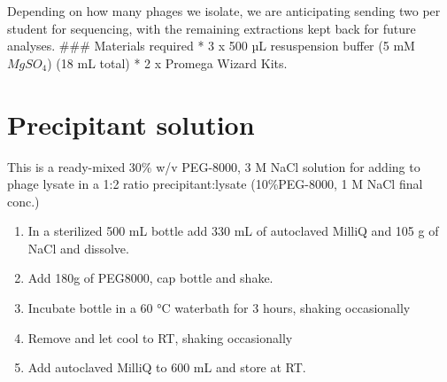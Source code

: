 \documentclass[
]{book}
\providecommand{\tightlist}{%
  \setlength{\itemsep}{0pt}\setlength{\parskip}{0pt}}
\begin{document}
Depending on how many phages we isolate, we are anticipating sending two per student for sequencing, with the remaining extractions kept back for future analyses.
\#\#\# Materials required
* 3 x 500 µL resuspension buffer (5 mM \(MgSO_{4}\)) (18 mL total)
* 2 x Promega Wizard Kits.

\hypertarget{precipitant-solution}{%
\section{Precipitant solution}\label{precipitant-solution}}

This is a ready-mixed 30\% w/v PEG-8000, 3 M NaCl solution for adding to phage lysate in a 1:2 ratio precipitant:lysate (10\%PEG-8000, 1 M NaCl final conc.)

\begin{enumerate}
\def\labelenumi{\arabic{enumi}.}
\tightlist
\item
  In a sterilized 500 mL bottle add 330 mL of autoclaved MilliQ and 105 g of NaCl and dissolve.
\item
  Add 180g of PEG8000, cap bottle and shake.
\item
  Incubate bottle in a 60 °C waterbath for 3 hours, shaking occasionally
\item
  Remove and let cool to RT, shaking occasionally
\item
  Add autoclaved MilliQ to 600 mL and store at RT.
\end{enumerate}

  
\end{document}
